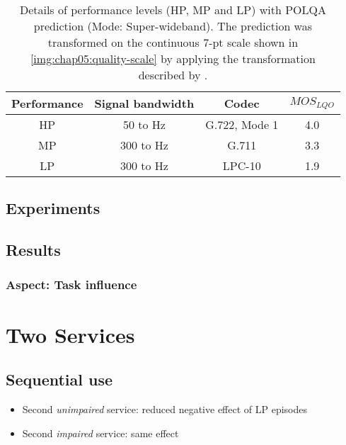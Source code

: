 \begin{table}
 \centering
 \begin{tabulary}{\columnwidth}{C|C|C|C}
   Performance & Signal bandwidth & Codec & $MOS_{LQO}$ \\
   \midrule
   HP & 50 to \unit[7000]{Hz}  & G.722, Mode 1 & 4.0 \\ %
   \hline
   MP & 300 to \unit[3400]{Hz} & G.711         & 3.3 \\ %
   \hline
   LP & 300 to \unit[3400]{Hz} & LPC-10        & 1.9 \\ %
   \end{tabulary}
   \caption{Details of performance levels (\ac{HP}, \ac{MP} and \ac{LP}) with \ac{POLQA} prediction (Mode: Super-wideband). The prediction was transformed on the continuous 7-pt scale shown in \autoref{img:chap05:quality-scale} by applying the transformation described by  \cite{koster_comparison_2015}.}
   \label{tab:performance}
\end{table}

\subsection{Experiments}


\subsection{Results}

\subsubsection*{Aspect: Task influence}


\section{Two Services}
\subsection{Sequential use}
\begin{itemize}
\item Second \textit{unimpaired} service: reduced negative effect of LP episodes
\item Second \textit{impaired} service: same effect
\end{itemize}

